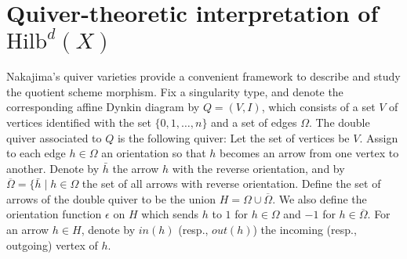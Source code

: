 \documentclass{amsart}[12pt]
\theoremstyle{definition}
\theoremstyle{remark}
\numberwithin{equation}{section}
\begin{document}
\section{Quiver-theoretic interpretation of $\mathrm{Hilb}^{d}(X)$}

Nakajima's quiver varieties provide a convenient framework to describe and study the quotient scheme morphism. Fix a singularity type, and denote the corresponding affine Dynkin diagram by $Q = (V, I)$, which consists of a set $V$ of vertices identified with the set $\{0, 1, \dots, n \}$ and a set of edges $\Omega$. The double quiver associated to $Q$ is the following quiver: Let the set of vertices be $V$. Assign to each edge $h \in \Omega$ an orientation so that $h$ becomes an arrow from one vertex to another. Denote by $\bar{h}$ the arrow $h$ with the reverse orientation, and by $\overline{\Omega} = \{ \bar{h} \mid h \in \Omega$ the set of all arrows with reverse orientation. Define the set of arrows of the double quiver to be the union $H = \Omega \cup \overline{\Omega}$. We also define the orientation function $\epsilon$ on $H$ which sends $h$ to $1$ for $h \in \Omega$ and $-1$ for $h \in \overline{\Omega}$. For an arrow $h \in H$, denote by $in (h)$ (resp., $out (h)$) the incoming (resp., outgoing) vertex of $h$.
\end{document}

